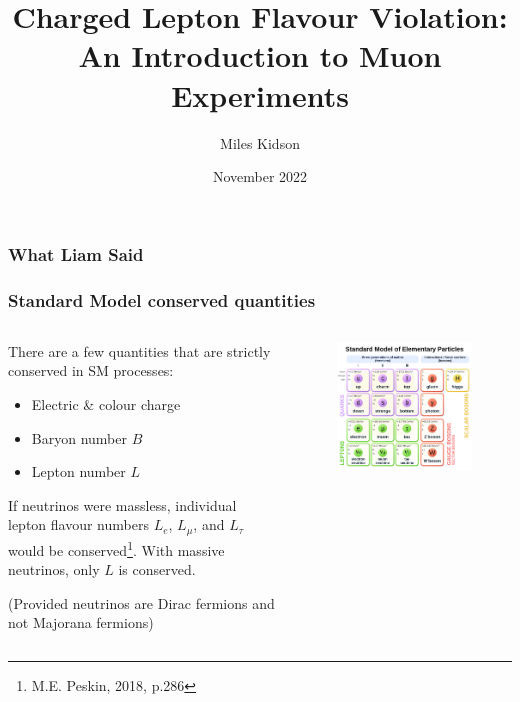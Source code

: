 \documentclass[11pt]{beamer}
\title[Charged Lepton Flavour Violation]{Charged Lepton Flavour Violation: \\ An Introduction to Muon Experiments} %
\author[Miles Kidson]{Miles Kidson} %
\institute[UCT]{University of Cape Town \\ \smallskip \textit{kdsmil001@myuct.ac.za}} %
\date[November 2022]{November 2022} %
\begin{document}
\frame[plain]{\titlepage}

\begin{frame}
    \frametitle{What Liam Said}

    

\end{frame}

\begin{frame}
    \frametitle{Standard Model conserved quantities}
    \begin{columns}[c]
        \begin{column}{0.6\textwidth}
            There are a few quantities that are strictly conserved in SM processes:
            \bigskip
            \begin{itemize}
                \item Electric \& colour charge
                \item Baryon number $B$
                \item Lepton number $L$
            \end{itemize}
            \bigskip
            If neutrinos were massless, individual lepton flavour numbers $L_e$, $L_\mu$, and $L_\tau$ would be conserved\footnote[frame]{M.E. Peskin, 2018, p.286}. With massive neutrinos, only $L$ is conserved.

            (Provided neutrinos are Dirac fermions and not Majorana fermions)

        \end{column}
        \begin{column}{0.4\textwidth}
            \begin{figure}[h]
                \begin{center}
                    \includegraphics[width=\textwidth]{SM.png}
                \end{center}
            \end{figure}
            

\end{column}
\end{columns}
\end{frame}
\end{document}
